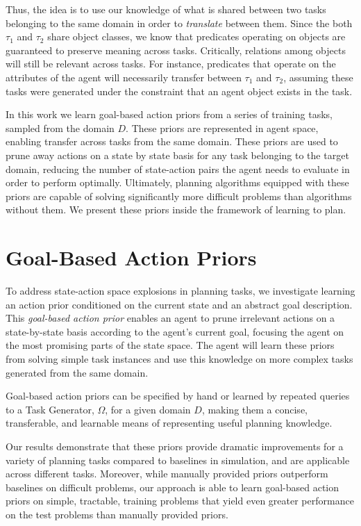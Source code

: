 \documentclass[11pt]{article}
\begin{document}
Thus, the idea is to use our knowledge of what is shared between two tasks belonging to the same domain in order to {\it translate} between them. Since the both $\tau_1$ and $\tau_2$ share object classes, we know that predicates operating on objects are guaranteed to preserve meaning across tasks. Critically, relations among objects will still be relevant across tasks. For instance, predicates that operate on the attributes of the agent will necessarily transfer between $\tau_1$ and $\tau_2$, assuming these tasks were generated under the constraint that an agent object exists in the task.

In this work we learn goal-based action priors from a series of training tasks, sampled from the domain $D$. These priors are represented in agent space, enabling transfer across tasks from the same domain. These priors are used to prune away actions on a state by state basis for any task belonging to the target domain, reducing the number of state-action pairs the agent needs to evaluate in order to perform optimally. Ultimately, planning algorithms equipped with these priors are capable of solving significantly more difficult problems than algorithms without them. We present these priors inside the framework of learning to plan.

\section{Goal-Based Action Priors}
\label{sec:gbaps}

To address state-action space explosions in planning tasks,
we investigate learning an action prior conditioned on the current state and an abstract goal description. This {\it goal-based action prior}
enables an agent to prune irrelevant actions on a
state-by-state basis according to the agent's current goal, focusing the agent on
the most promising parts of the state space. The agent will learn these priors from solving simple task instances and use this knowledge on more complex tasks generated from the same domain.
 
Goal-based action priors can be specified by hand or learned by repeated queries to a Task Generator, $\Omega$, for a given domain $D$, making them a concise, transferable, and learnable means of representing useful planning knowledge. 

Our results demonstrate
that these priors provide dramatic improvements for a variety of
planning tasks compared to baselines in simulation, and are applicable
across different tasks.  Moreover, while manually provided
priors outperform baselines on difficult problems, our approach
is able to learn goal-based action priors on simple, tractable, 
training problems that yield even greater performance on the test problems
than manually provided priors.
\end{document}
